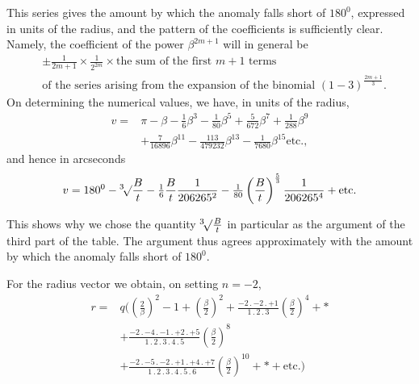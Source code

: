 \par
This series gives the amount by which the anomaly falls short of \(180^0\), expressed in units of the radius, and the pattern of the coefficients is sufficiently clear. Namely, the coefficient of the power \(\beta^{2m+1}\) will in general be
\[
\begin{aligned}
&\pm\frac{1}{2m+1}\times\frac{1}{2^{2m}}\times\text{the sum of the first }m+1\text{ terms}\\
&\text{of the series arising from the expansion of the binomial }(1-3)^{\frac{2m+1}{3}}\text{.}
\end{aligned}
\]
On determining the numerical values, we have, in units of the radius,
\[
\begin{aligned}
v={}&\pi-\beta-\tfrac16\beta^3-\tfrac1{80}\beta^5+\tfrac5{672}\beta^7+\tfrac1{288}\beta^9\\
&+\tfrac7{16896}\beta^{11}-\tfrac{113}{479232}\beta^{13}-\tfrac1{7680}\beta^{15}\text{etc.,}
\end{aligned}
\]
and hence in arcseconds
\[
v=180^0-\BareRoot[3]{\frac{B}{t}}-\tfrac16\frac{B}{t}\frac1{206265^2}
-\tfrac1{80}\left(\frac{B}{t}\right)^{\frac53}\frac1{206265^4}+\text{etc.}
\]
\par
This shows why we chose the quantity \(\BareRoot[3]{\frac{B}{t}}\) in particular as the argument of the third part of the table. The argument thus agrees approximately with the amount by which the anomaly falls short of \(180^0\).
\par
For the radius vector we obtain, on setting \(n=-2\),
\[
\begin{aligned}
r={}&q\Biggl(\left(\frac2\beta\right)^2-1+\left(\frac\beta2\right)^2
+\frac{-2\mathpunct{.}-2\mathpunct{.}+1}{1\mathpunct{.}2\mathpunct{.}3}\left(\frac\beta2\right)^4+\ast\\
&+\frac{-2\mathpunct{.}-4\mathpunct{.}-1\mathpunct{.}+2\mathpunct{.}+5}{1\mathpunct{.}2\mathpunct{.}3\mathpunct{.}4\mathpunct{.}5}\left(\frac\beta2\right)^8\\
&+\frac{-2\mathpunct{.}-5\mathpunct{.}-2\mathpunct{.}+1\mathpunct{.}+4\mathpunct{.}+7}{1\mathpunct{.}2\mathpunct{.}3\mathpunct{.}4\mathpunct{.}5\mathpunct{.}6}\left(\frac\beta2\right)^{10}+\ast+\text{etc.}\Biggr)
\end{aligned}
\]
